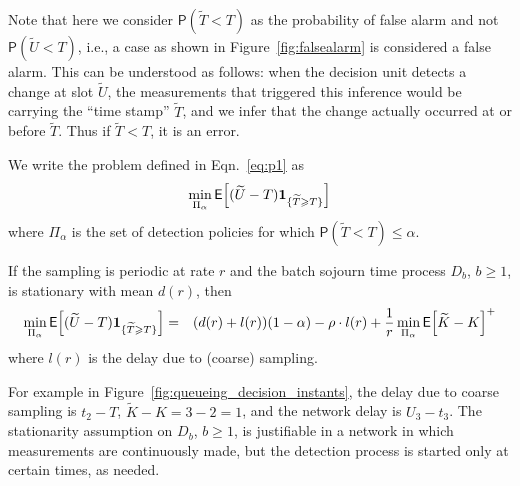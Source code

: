 \documentclass[acmtosn]{acmtrans2m}
\newcommand{\prob}[1]{\mathsf{P}\left(#1\right)}
\newcommand{\EXP}[1]{\mathsf{E}\!\left[#1\right]}
\begin{document}
\begin{remarks}
Note that here we consider $\prob{\widetilde{T}<T}$ as the probability
of false alarm and not $\prob{\widetilde{U}<T}$, i.e., a case as shown
in Figure~\ref{fig:falsealarm} is considered a false alarm. This can be
understood as follows: when the decision unit detects a change at slot
$\widetilde{U}$, the measurements that triggered this inference would be
carrying the ``time stamp'' $\widetilde{T}$, and we infer that the
change actually occurred at or before $\widetilde{T}$. Thus if
$\widetilde{T}<T$, it is an error.   
\end{remarks}

We write the problem defined in Eqn.~\ref{eq:p1} as	
\begin{eqnarray}
  \min_{\Pi_{\alpha}}\EXP{(\widetilde{U}-T){\bf 1}_{\{\widetilde{T}\geqslant T\}}}
\end{eqnarray}
where $\Pi_{\alpha}$ is the set of detection policies for which
$\prob{\widetilde{T}<T} \leqslant \alpha$.


\begin{theorem}
\label{thm:decoupling}
If the sampling is periodic at rate $r$ and the batch sojourn time 
process $D_b$, $b\geqslant 1$, is stationary with mean $d(r)$, then
\begin{eqnarray*}
\min_{\Pi_{\alpha}}\EXP{(\widetilde{U}-T){\bf 1}_{\{\widetilde{T}\geqslant T\}}}
&=& (d(r)+l(r))(1-\alpha) - \rho\cdot l(r) + \frac{1}{r}\min_{\Pi_{\alpha}}\EXP{\widetilde{K}-K}^+
\end{eqnarray*}
where  $l(r)$ is the delay due to (coarse) sampling.
\end{theorem}

\begin{remarks}
  For example in Figure~\ref{fig:queueing_decision_instants}, the
  delay due to coarse sampling is $t_2-T$, $\widetilde{K}-K=3-2=1$, and
  the network delay is $U_3-t_3$.  The stationarity assumption on
  $D_b$, $b\geqslant 1$, is justifiable in a network in which measurements
  are continuously made, but the detection process is started only at
  certain times, as needed. 
\end{remarks}
\end{document}
